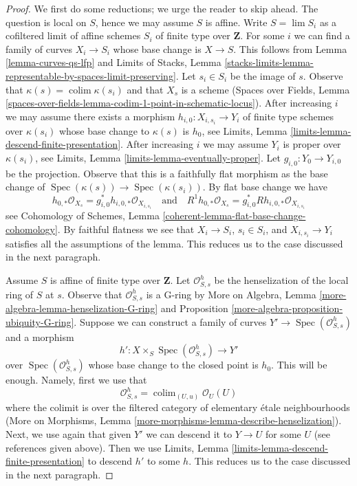 \documentclass[10pt,a4paper]{amsart}
\theoremstyle{plain}
\theoremstyle{definition}
\theoremstyle{remark}
\numberwithin{equation}{subsection}
\def\lim{\mathop{\mathrm{lim}}\nolimits}
\def\colim{\mathop{\mathrm{colim}}\nolimits}
\def\Spec{\mathop{\mathrm{Spec}}}
\begin{document}
\begin{proof}
We first do some reductions; we urge the reader to skip ahead.
The question is local on $S$, hence we may assume $S$ is affine.
Write $S = \lim S_i$ as a cofiltered limit of affine schemes $S_i$
of finite type over $\mathbf{Z}$.
For some $i$ we can find a family of curves $X_i \to S_i$
whose base change is $X \to S$. This follows from
Lemma \ref{lemma-curves-qs-lfp} and
Limits of Stacks, Lemma
\ref{stacks-limits-lemma-representable-by-spaces-limit-preserving}.
Let $s_i \in S_i$ be the image of $s$. Observe that
$\kappa(s) = \colim \kappa(s_i)$ and that $X_s$ is a scheme
(Spaces over Fields, Lemma
\ref{spaces-over-fields-lemma-codim-1-point-in-schematic-locus}).
After increasing $i$ we may assume there exists a morphism
$h_{i, 0} : X_{i, s_i} \to Y_i$
of finite type schemes over $\kappa(s_i)$ whose base change to
$\kappa(s)$ is $h_0$, see
Limits, Lemma \ref{limits-lemma-descend-finite-presentation}.
After increasing $i$ we may assume $Y_i$ is proper over $\kappa(s_i)$, see
Limits, Lemma \ref{limits-lemma-eventually-proper}.
Let $g_{i, 0} : Y_0 \to Y_{i, 0}$ be the projection. Observe that
this is a faithfully flat morphism as the base change of
$\Spec(\kappa(s)) \to \Spec(\kappa(s_i))$.
By flat base change we have
$$
h_{0, *}\mathcal{O}_{X_s} = g_{i, 0}^*h_{i, 0, *}\mathcal{O}_{X_{i, s_i}}
\quad\text{and}\quad
R^1h_{0, *}\mathcal{O}_{X_s} = g_{i, 0}^*Rh_{i, 0, *}\mathcal{O}_{X_{i, s_i}}
$$
see Cohomology of Schemes, Lemma
\ref{coherent-lemma-flat-base-change-cohomology}.
By faithful flatness we see that $X_i \to S_i$, $s_i \in S_i$, and
$X_{i, s_i} \to Y_i$ satisfies all the assumptions of the lemma.
This reduces us to the case discussed in the next paragraph.

\medskip\noindent
Assume $S$ is affine of finite type over $\mathbf{Z}$.
Let $\mathcal{O}_{S, s}^h$ be the henselization of the local
ring of $S$ at $s$. Observe that $\mathcal{O}_{S, s}^h$ is a G-ring by
More on Algebra, Lemma \ref{more-algebra-lemma-henselization-G-ring} and
Proposition \ref{more-algebra-proposition-ubiquity-G-ring}.
Suppose we can construct a family of curves
$Y' \to \Spec(\mathcal{O}_{S, s}^h)$ and a morphism
$$
h' : X \times_S \Spec(\mathcal{O}_{S, s}^h) \longrightarrow Y'
$$
over $\Spec(\mathcal{O}_{S, s}^h)$ whose base change to the closed
point is $h_0$. This will be enough. Namely, first we use that
$$
\mathcal{O}_{S, s}^h = \colim_{(U, u)} \mathcal{O}_U(U)
$$
where the colimit is over the filtered category of 
elementary \'etale neighbourhoods (More on Morphisms, Lemma
\ref{more-morphisms-lemma-describe-henselization}).
Next, we use again that given $Y'$ we can descend it to
$Y \to U$ for some $U$ (see references given above).
Then we use
Limits, Lemma \ref{limits-lemma-descend-finite-presentation}
to descend $h'$ to some $h$. This reduces us to the case
discussed in the next paragraph.


\end{proof}
\end{document}
